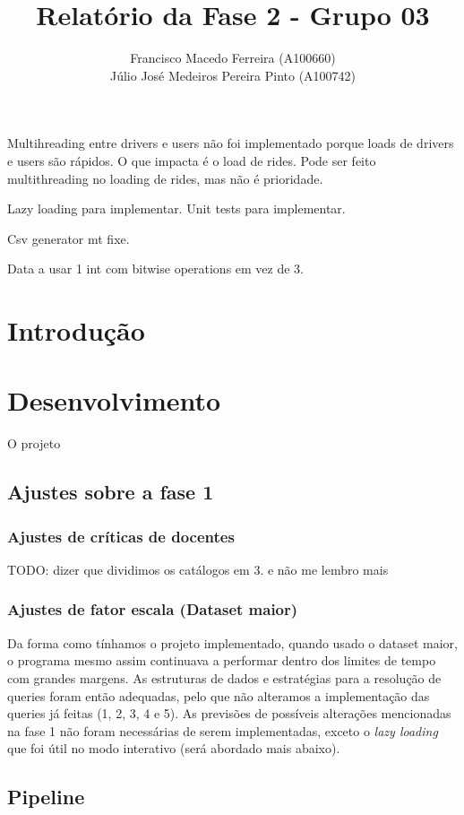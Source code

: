 \documentclass{article}
\title{Relatório da Fase 2 - Grupo 03}
\author{Francisco Macedo Ferreira (A100660)\\Júlio José Medeiros Pereira Pinto (A100742)}
\begin{document}
  
    \maketitle
    Multihreading entre drivers e users não foi implementado porque loads de drivers e users são rápidos.
    O que impacta é o load de rides.
    Pode ser feito multithreading no loading de rides, mas não é prioridade.

    Lazy loading para implementar.
    Unit tests para implementar.

    Csv generator mt fixe.

    Data a usar 1 int com bitwise operations em vez de 3.

    \section{Introdução}
    \lipsum[1]
    
    \section{Desenvolvimento}
    O projeto 
    \subsection{Ajustes sobre a fase 1}
        \subsubsection{Ajustes de críticas de docentes}
            TODO: dizer que dividimos os catálogos em 3. e não me lembro mais

        \subsubsection{Ajustes de fator escala (Dataset maior)}
            Da forma como tínhamos o projeto implementado, quando 
            usado o dataset maior, o programa mesmo assim continuava
            a performar dentro dos limites de tempo com grandes 
            margens. As estruturas de dados e estratégias para
            a resolução de queries foram então adequadas, pelo que
            não alteramos a implementação das queries já feitas
            (1, 2, 3, 4 e 5). As previsões de possíveis alterações
            mencionadas na fase 1 não foram necessárias de serem
            implementadas, exceto o \emph{lazy loading} que foi
            útil no modo interativo (será abordado mais abaixo).
        
    \subsection{Pipeline}
        


    
\end{document}
